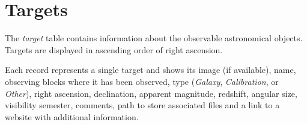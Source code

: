 

\section{Targets}

The \textsl{target} table contains information about the observable astronomical objects. Targets are displayed in ascending order of right ascension.

Each record represents a single target and shows its image (if available), name, observing blocks where it has been observed, type (\textsl{Galaxy}, \textsl{Calibration}, or \textsl{Other}), right ascension, declination, apparent magnitude, redshift, angular size, visibility semester, comments, path to store associated files and a link to a website with additional information.


